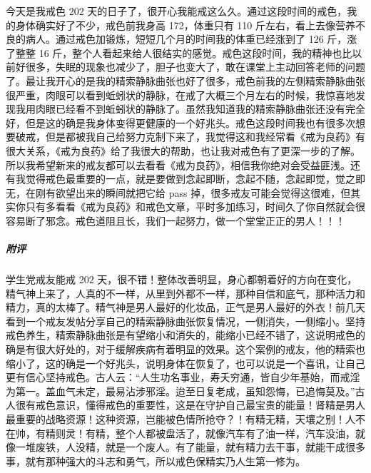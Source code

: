 \begin{case}
    今天是我戒色 202 天的日子了，很开心我能戒这么久。通过这段时间的戒色，我的身体确实好了不少，戒色前我身高 172，体重只有 110 斤左右，看上去像营养不良的病人。通过戒色加锻炼，短短几个月的时间我的体重已经涨到了 126 斤，涨了整整 16 斤，整个人看起来给人很结实的感觉。戒色这段时间，我的精神也比以前好很多，失眠的现象也减少了，胆子也变大了，敢在课堂上主动回答老师的问题了。最让我开心的是我的精索静脉曲张也好了很多，戒色前我的左侧精索静脉曲张很严重，肉眼可以看到蚯蚓状的静脉，在戒了大概三个月左右的时候，我惊喜地发现我用肉眼已经看不到蚯蚓状的静脉了。虽然我知道我的精索静脉曲张还没有完全好，但是这的确是我身体变得更健康的一个好兆头。戒色这段时间我也有很多次想要破戒，但是都被我自己给努力克制下来了，我觉得这和我经常看《戒为良药》有很大关系，《戒为良药》给了我很大的帮助，也让我对戒色有了更深一步的了解。所以我希望新来的戒友都可以去看看《戒为良药》，相信我你绝对会受益匪浅。还有我觉得戒色最重要的一点，就是要做到念起即断，念起不随，念起即觉，觉之即无，在刚有欲望出来的瞬间就把它给 pass 掉，很多戒友可能会觉得这很难，但其实你只有多看看《戒为良药》和戒色文章，平时多加练习，时间久了你自然就会很容易断了邪念。戒色道阻且长，我们一起努力，做一个堂堂正正的男人！！！
    \subparagraph{附评} 学生党戒友能戒 202 天，很不错！整体改善明显，身心都朝着好的方向在变化，精气神上来了，人真的不一样，从里到外都不一样，那种自信和底气，那种活力和精力，真的太棒了。精气神是男人最好的化妆品，正气是男人最好的外衣！前几天看到一个戒友发帖分享自己的精索静脉曲张恢复情况，一侧消失，一侧缩小。坚持戒色养生，精索静脉曲张是有望缩小和消失的，能缩小已经不错了，这说明戒色的确是有很大好处的，对于缓解疾病有着明显的效果。这个案例的戒友，他的精索也缩小了，这的确是一个好兆头，说明身体在恢复了，也可以说是一个喜讯，让自己更有信心坚持戒色。古人云：“人生功名事业，寿夭穷通，皆自少年基始，而戒淫为第一。盖血气未定，最易沾涉邪淫。迨至日复老成，虽知怨悔，已追悔莫及。”古人很有戒色意识，懂得戒色的重要性，这是在守护自己最宝贵的能量！肾精是男人最重要的战略资源！这种资源，岂能被色情所抢夺？！有精无精，天壤之别！人不在帅，有精则灵！有精，整个人都被盘活了，就像汽车有了油一样，汽车没油，就像一堆废铁，人没精，就是一个废人。有了能量，就有精力去干事，就能干成很多事，就有那种强大的斗志和勇气，所以戒色保精实乃人生第一修为。
\end{case}

